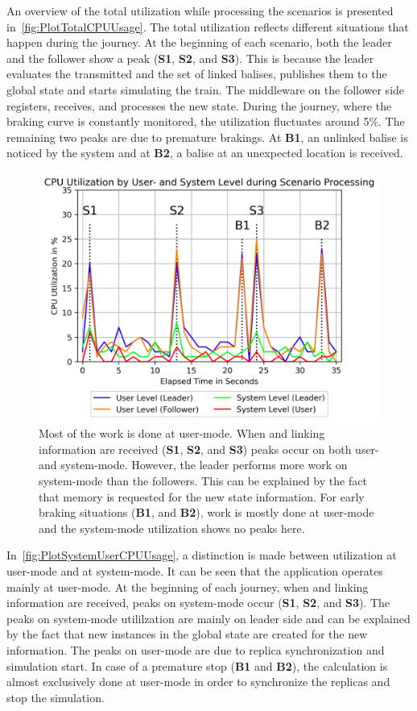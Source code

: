 An overview of the total  utilization while processing the scenarios is presented in~\autoref{fig:PlotTotalCPUUsage}.
The total  utilization reflects different situations that happen during the journey.
At the beginning of each scenario, both the leader and the follower show a peak (\textbf{S1}, \textbf{S2}, and \textbf{S3}).
This is because the leader evaluates the transmitted  and the set of linked balises, publishes them to the global state and starts simulating the train.
The middleware on the follower side registers, receives, and processes the new state.
During the journey, where the braking curve is constantly monitored, the utilization fluctuates around 5\%.
The remaining two peaks are due to premature brakings.
At \textbf{B1}, an unlinked balise is noticed by the system and at \textbf{B2}, a balise at an unexpected location is received.

\begin{figure}[!hbt]
	\centering
	\includegraphics[width=0.8\linewidth]{images/plots/SystemUserCPUUsage}
	\caption{Most of the  work is done at user-mode. When  and linking information are received (\textbf{S1}, \textbf{S2}, and \textbf{S3}) peaks occur on both user- and system-mode. However, the leader performs more work on system-mode than the followers. This can be explained by the fact that memory is requested for the new state information. For early braking situations (\textbf{B1}, and \textbf{B2}), work is mostly done at user-mode and the system-mode utilization shows no peaks here.}
	\label{fig:PlotSystemUserCPUUsage}
\end{figure}

In~\autoref{fig:PlotSystemUserCPUUsage}, a distinction is made between  utilization at user-mode and at system-mode.
It can be seen that the application operates mainly at user-mode.
At the beginning of each journey, when  and linking information are received, peaks on system-mode occur (\textbf{S1}, \textbf{S2}, and \textbf{S3}).
The peaks on system-mode utililzation are mainly on leader side and can be explained by the fact that new instances in the global state are created for the new information.
The peaks on user-mode are due to replica synchronization and simulation start.
In case of a premature stop (\textbf{B1} and \textbf{B2}), the calculation is almost exclusively done at user-mode in order to synchronize the replicas and stop the simulation.

